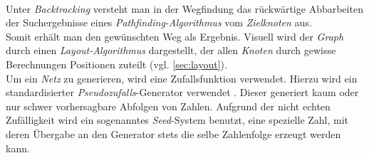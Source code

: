 \documentclass[12pt]{article}
\begin{document}
\\
Unter \textit{Backtracking} versteht man in der Wegfindung das rückwärtige Abbarbeiten der Suchergebnisse eines \textit{Pathfinding-Algorithmus} vom \textit{Zielknoten} aus. 
\\
Somit erhält man den gewünschten Weg als Ergebnis. Visuell wird der \textit{Graph} durch einen \textit{Layout-Algorithmus} dargestellt, der allen \textit{Knoten} durch gewisse Berechnungen Positionen zuteilt (vgl. \autoref{sec:layout}).
\\
Um ein \textit{Netz} zu generieren, wird eine Zufallsfunktion verwendet. Hierzu wird ein standardisierter \textit{Pseudozufalls}-Generator verwendet \cite{random}. Dieser generiert kaum oder nur schwer vorhersagbare Abfolgen von Zahlen. Aufgrund der nicht echten Zufälligkeit wird ein sogenanntes \textit{Seed}-System benutzt, eine spezielle Zahl, mit deren Übergabe an den Generator stets die selbe Zahlenfolge erzeugt werden kann.
\end{document}
